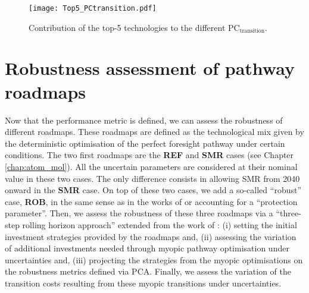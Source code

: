 \begin{figure}[!htbp]
\centering
\texttt{[image: Top5\_PCtransition.pdf]}
\caption{Contribution of the top-5 technologies to the different $\text{PC}_{\text{transition}}$. }
\label{fig:Top5_PC_transition}
\end{figure}

\newpage
\section{Robustness assessment of pathway roadmaps}
\label{sec:RobPol:Rob_Assessment}
Now that the performance metric is defined, we can assess the robustness of different roadmaps. These roadmaps are defined as the technological mix given by the deterministic optimisation of the perfect foresight pathway under certain conditions. The two first roadmaps are the \textbf{REF} and \textbf{SMR} cases (see Chapter \ref{chap:atom_mol}). All the uncertain parameters are considered at their nominal value in these two cases. The only difference consists in allowing \gls{SMR} from 2040 onward in the \textbf{SMR} case. On top of these two cases, we add a so-called ``robust'' case, \textbf{ROB}, in the same sense as in the works of \citet{bertsimas2004price} or \citet{Moret2017PhDThesis} accounting for a ``protection parameter''. Then, we assess the robustness of these three roadmaps via a ``three-step rolling horizon approach'' extended from the work of \citet{moret2020overcapacity}: (i) setting the initial investment strategies provided by the roadmaps and, (ii) assessing the variation of additional investments needed through myopic pathway optimisation under uncertainties and, (iii) projecting the strategies from the myopic optimisations on the robustness metrics defined via \gls{PCA}. Finally, we assess the variation of the transition costs resulting from these myopic transitions under uncertainties.

